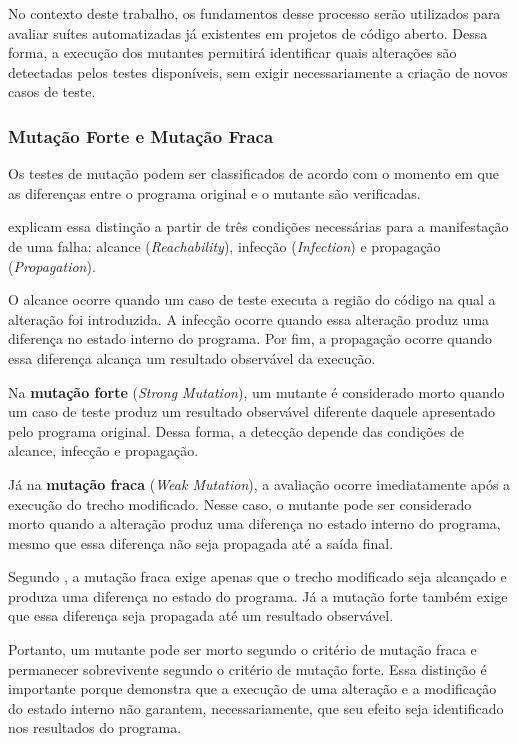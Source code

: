 No contexto deste trabalho, os fundamentos desse processo serão utilizados para avaliar suítes automatizadas já existentes em projetos de código aberto. Dessa forma, a execução dos mutantes permitirá identificar quais alterações são detectadas pelos testes disponíveis, sem exigir necessariamente a criação de novos casos de teste.

\subsubsection{Mutação Forte e Mutação Fraca}

Os testes de mutação podem ser classificados de acordo com o momento em que as diferenças entre o programa original e o mutante são verificadas.

 explicam essa distinção a partir de três condições necessárias para a manifestação de uma falha: alcance (\textit{Reachability}), infecção (\textit{Infection}) e propagação (\textit{Propagation}).

O alcance ocorre quando um caso de teste executa a região do código na qual a alteração foi introduzida. A infecção ocorre quando essa alteração produz uma diferença no estado interno do programa. Por fim, a propagação ocorre quando essa diferença alcança um resultado observável da execução.

Na \textbf{mutação forte} (\textit{Strong Mutation}), um mutante é considerado morto quando um caso de teste produz um resultado observável diferente daquele apresentado pelo programa original. Dessa forma, a detecção depende das condições de alcance, infecção e propagação.

Já na \textbf{mutação fraca} (\textit{Weak Mutation}), a avaliação ocorre imediatamente após a execução do trecho modificado. Nesse caso, o mutante pode ser considerado morto quando a alteração produz uma diferença no estado interno do programa, mesmo que essa diferença não seja propagada até a saída final.

Segundo , a mutação fraca exige apenas que o trecho modificado seja alcançado e produza uma diferença no estado do programa. Já a mutação forte também exige que essa diferença seja propagada até um resultado observável.

Portanto, um mutante pode ser morto segundo o critério de mutação fraca e permanecer sobrevivente segundo o critério de mutação forte. Essa distinção é importante porque demonstra que a execução de uma alteração e a modificação do estado interno não garantem, necessariamente, que seu efeito seja identificado nos resultados do programa.

